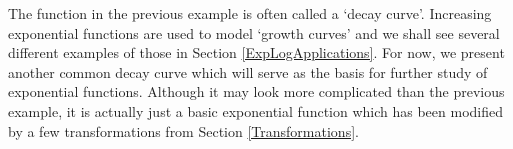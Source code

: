 \medskip

The function in the previous example is often called a `decay curve'.  Increasing exponential functions are used to model `growth curves' and we shall see several different examples of those in Section \ref{ExpLogApplications}.  For now, we present another common decay curve which will serve as the basis for further study of exponential functions.  Although it may look more complicated than the previous example, it is actually just a basic exponential function which has been modified by a few transformations from Section \ref{Transformations}.

\medskip

